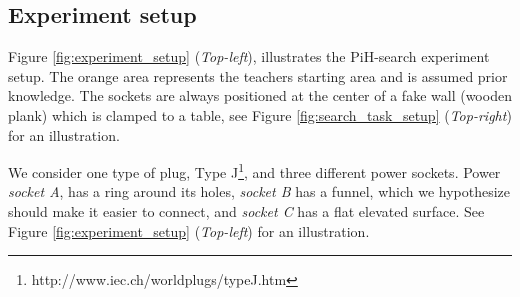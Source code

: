\subsection{Experiment setup}
%
%
%

%
%



Figure \ref{fig:experiment_setup} (\textit{Top-left}), illustrates the PiH-search experiment setup. The orange area represents 
the teachers starting area and is assumed prior knowledge. The sockets are always positioned at the center of a fake wall (wooden plank) which is clamped to a table, see 
Figure \ref{fig:search_task_setup} (\textit{Top-right}) for an illustration. 

We consider one type of plug, Type J\footnote{http://www.iec.ch/worldplugs/typeJ.htm}, and three different power sockets. 
Power \textit{socket A}, has a ring around its holes, \textit{socket B} has a funnel, which we hypothesize should make 
it easier to connect, and \textit{socket C} has a flat elevated surface. See Figure \ref{fig:experiment_setup}
(\textit{Top-left}) for an illustration. 

